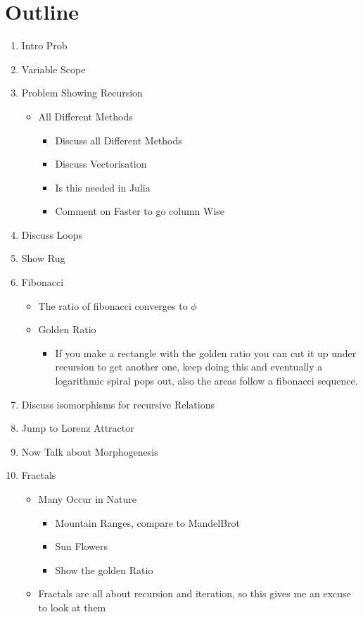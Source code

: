 \documentclass[11pt]{article}
\begin{document}
\section{Outline}
\label{sec:org34ac963}
\begin{enumerate}
\item Intro Prob
\item Variable Scope
\item Problem Showing Recursion
\begin{itemize}
\item All Different Methods
\begin{itemize}
\item Discuss all Different Methods
\item Discuss Vectorisation
\item Is this needed in Julia
\item Comment on Faster to go column Wise
\end{itemize}
\end{itemize}
\item Discuss Loops
\item Show Rug
\item Fibonacci
\begin{itemize}
\item The ratio of fibonacci converges to \(\phi\)
\item Golden Ratio
\begin{itemize}
\item If you make a rectangle with the golden ratio you can cut it up under
recursion to get another one, keep doing this and eventually a logarithmic
spiral pops out, also the areas follow a fibonacci sequence.
\end{itemize}
\end{itemize}
\item Discuss isomorphisms for recursive Relations
\item Jump to Lorenz Attractor
\item Now Talk about Morphogenesis
\item Fractals
\begin{itemize}
\item Many Occur in Nature
\begin{itemize}
\item Mountain Ranges, compare to MandelBrot
\item Sun Flowers
\item Show the golden Ratio
\end{itemize}
\item Fractals are all about recursion and iteration, so this gives me an excuse to look at them

\end{itemize}
\end{enumerate}
\end{document}

